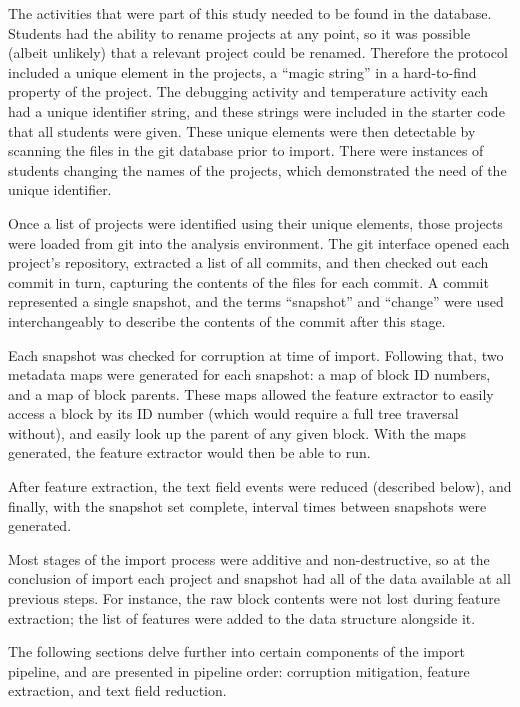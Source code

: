 The activities that were part of this study needed to be found in the database. Students had the ability to rename projects at any point, so it was possible (albeit unlikely) that a relevant project could be renamed. Therefore the protocol included a unique element in the projects, a ``magic string'' in a hard-to-find property of the project. The debugging activity and temperature activity each had a unique identifier string, and these strings were included in the starter code that all students were given. These unique elements were then detectable by scanning the files in the git database prior to import. There were instances of students changing the names of the projects, which demonstrated the need of the unique identifier. 

Once a list of projects were identified using their unique elements, those projects were loaded from git into the analysis environment. The git interface opened each project's repository, extracted a list of all commits, and then checked out each commit in turn, capturing the contents of the files for each commit. A commit represented a single snapshot, and the terms ``snapshot'' and ``change'' were used interchangeably to describe the contents of the commit after this stage. 

Each snapshot was checked for corruption at time of import. Following that, two metadata maps were generated for each snapshot: a map of block ID numbers, and a map of block parents. These maps allowed the feature extractor to easily access a block by its ID number (which would require a full tree traversal without), and easily look up the parent of any given block. With the maps generated, the feature extractor would then be able to run. 

After feature extraction, the text field events were reduced (described below), and finally, with the snapshot set complete, interval times between snapshots were generated.

Most stages of the import process were additive and non-destructive, so at the conclusion of import each project and snapshot had all of the data available at all previous steps. For instance, the raw block contents were not lost during feature extraction; the list of features were added to the data structure alongside it. 

The following sections delve further into certain components of the import pipeline, and are presented in pipeline order: corruption mitigation, feature extraction, and text field reduction.



